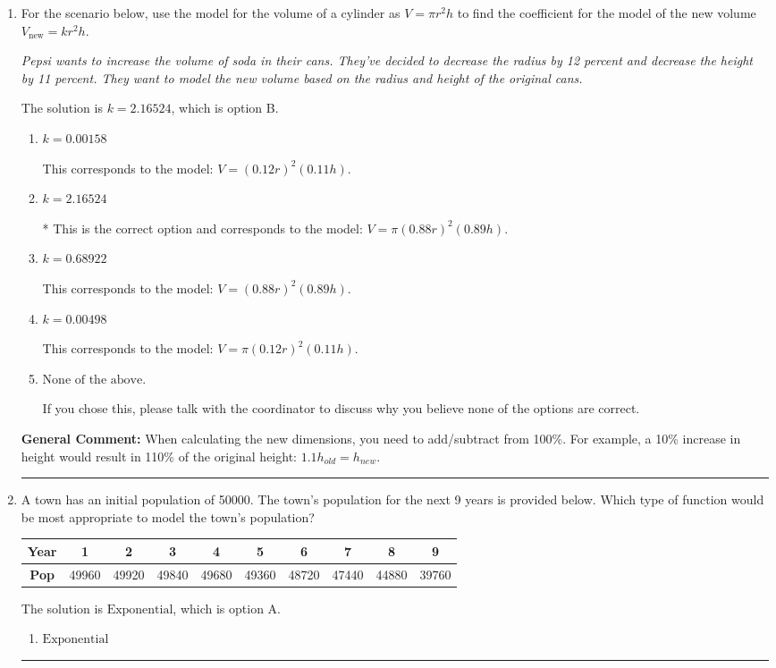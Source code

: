 \documentclass{extbook}[14pt]
\newcommand{\litem}[1]{\item #1

\rule{\textwidth}{0.4pt}}
\begin{document}
\begin{enumerate}\litem{
For the scenario below, use the model for the volume of a cylinder as $V = \pi r^2 h$ to find the coefficient for the model of the new volume $V_{\text{new}} = k r^2 h$.

\begin{center}
    \textit{ Pepsi wants to increase the volume of soda in their cans. They've decided to decrease the radius by 12 percent and decrease the height by 11 percent. They want to model the new volume based on the radius and height of the original cans. }
\end{center}
The solution is \( k = 2.16524 \), which is option B.\begin{enumerate}[label=\Alph*.]
\item \( k = 0.00158 \)

This corresponds to the model: $V = (0.12 r)^2 (0.11 h)$.
\item \( k = 2.16524 \)

* This is the correct option and corresponds to the model: $V = \pi (0.88 r)^2 (0.89 h)$.
\item \( k = 0.68922 \)

This corresponds to the model: $V = (0.88 r)^2 (0.89 h)$.
\item \( k = 0.00498 \)

This corresponds to the model: $V = \pi (0.12 r)^2 (0.11 h)$.
\item \( \text{None of the above.} \)

If you chose this, please talk with the coordinator to discuss why you believe none of the options are correct.
\end{enumerate}

\textbf{General Comment:} When calculating the new dimensions, you need to add/subtract from 100\%. For example, a 10\% increase in height would result in 110\% of the original height: $1.1h_{old} = h_{new}$.
}
\litem{
A town has an initial population of 50000. The town's population for the next 9 years is provided below. Which type of function would be most appropriate to model the town's population?


\begin{tabular}{c|c|c|c|c|c|c|c|c|c}
\textbf{Year} &1 &2 &3 &4 &5 &6 &7 &8 &9\tabularnewline \hline
\textbf{Pop} &49960 &49920 &49840 &49680 &49360 &48720 &47440 &44880 &39760\end{tabular}The solution is \( \text{Exponential} \), which is option A.\begin{enumerate}[label=\Alph*.]
\item \( \text{Exponential} \)


\end{enumerate}}
\end{enumerate}
\end{document}
